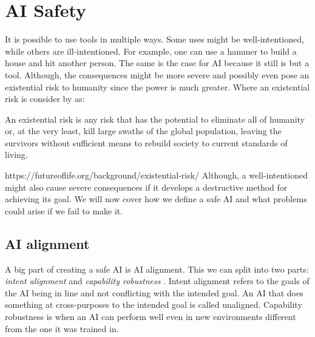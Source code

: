 \documentclass[12pt,A4]{report}
\theoremstyle{definition}
\begin{document}
\section{AI Safety}
It is possible to use tools in multiple ways. Some uses might be well-intentioned, while others are ill-intentioned. For example, one can use a hammer to build a house and hit another person. The same is the case for AI because it still is but a tool. Although, the consequences might be more severe and possibly even pose an existential risk to humanity since the power is much greater. Where an existential risk is consider by \autocite{Future of Life Institute} as:
\begin{displayquote}
An existential risk is any risk that has the potential to eliminate all of humanity or, at the very least, kill large swaths of the global population, leaving the survivors without sufficient means to rebuild society to current standards of living.
\end{displayquote}
https://futureoflife.org/background/existential-risk/
Although, a well-intentioned might also cause severe consequences if it develops a destructive method for achieving its goal. We will now cover how we define a safe AI and what problems could arise if we fail to make it.

\subsection{AI alignment}
A big part of creating a safe AI is AI alignment. This we can split into two parts: \textit{intent alignment} and \textit{capability robustness} \autocite{E Hubringer (alignmentforum)}. Intent alignment refers to the goals of the AI being in line and not conflicting with the intended goal. An AI that does something at cross-purposes to the intended goal is called unaligned. Capability robustness is when an AI can perform well even in new environments different from the one it was trained in. 
\end{document}
